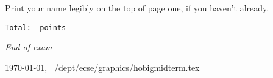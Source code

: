 \documentclass[twoside]{article}
\newcommand{\handout}{bigmidterm}
\begin{document}
\begin{enumerate}
% 

 Print your name legibly on the top of page one, if you
haven't already.

\end{enumerate}


{\tt Total: \thepoints\ points}

{\em End of exam} \label{end}

\vfill\hfill {\footnotesize \today, \printtime\ /dept/ecse/graphics/ho\handout.tex}
\end{document}
